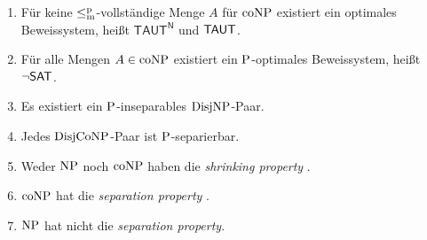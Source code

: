 \begin{corollary}
\begin{enumerate}[noitemsep,midpenalty=0]
        \item Für keine $\leqmp$-vollständige Menge $A$ für $\coNP$ existiert ein optimales Beweissystem, heißt $\mathsf{TAUT^N}$ und $\hTAUT$.
        \item Für alle Mengen $A\in\coNP$ existiert ein $\P$-optimales Beweissystem, heißt $\neg\hSAT$.
        \item Es existiert ein $\P$-inseparables $\DisjNP$-Paar.
        \item Jedes $\DisjCoNP$-Paar ist $\P$-separierbar.
        \item Weder $\NP$ noch $\coNP$ haben die \emph{shrinking property} \parencite{glaser_shrinking_2011}.
        \item $\coNP$ hat die \emph{separation property} \parencite{glaser_shrinking_2011}.
        \item $\NP$ hat nicht die \emph{separation property}.
    \end{enumerate}
\end{corollary}
